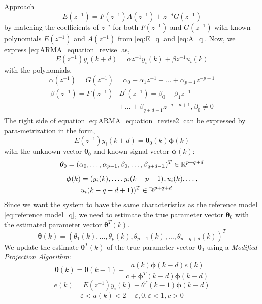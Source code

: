 \begin{section}{Approach}
    \begin{equation}
    \label{eq:Start}
	E(z^{-1})=F(z^{-1})A(z^{-1})+z^{-d}G(z^{-1})
	\end{equation}
by matching the coefficients of $z^{-i}$ for both $F(z^{-1})$ and $G(z^{-1})$ with known polynomials $E(z^{-1})$ and $A(z^{-1})$ from \eqref{eq:E_q} and \eqref{eq:A_q}.
Now, we express \eqref{eq:ARMA_equation_revise} as,
	\begin{equation}
	\label{eq:ARMA_equation_revise2}
	E(z^{-1})y_i(k+d)={\alpha}z^{-1}y_i(k) + {\beta}z^{-1}u_i(k)
	\end{equation}
with the polynomials,
	\begin{equation}
	\alpha(z^{-1})=G(z^{-1})=\alpha_0+\alpha_1z^{-1}+ \dots +\alpha_{p-1}z^{-p+1}
	\end{equation}
	\begin{align}
	\begin{split}
	\beta( z^{-1})= F(z^{-1})&B^{'}(z^{-1})=\beta_0+\beta_1z^{-1} \\
	& + \dots +\beta_{q+d-1}z^{-q-d+1}, \beta_0\neq0
	\end{split}
	\end{align}
The right side of equation \eqref{eq:ARMA_equation_revise2} can be expressed by para-metrization in the form,
    \begin{equation}
	E(z^{-1})y_i(k+d)=\bm{\theta}_0(k)\bm{\phi}(k)
	\end{equation}
with the unknown vector $\bm{\theta}_0$ and known signal vector $\bm{\phi}(k)$:
    \begin{equation}
	\bm{\theta}_0=(\alpha_0, \dots ,\alpha_{p-1},\beta_0, \dots ,\beta_{q+d-1})^T \in \mathbb{R}^{p+q+d}
	\end{equation}
	\begin{align}
	\begin{split}
	\bm{\phi}(k)&=(y_i(k), \dots ,y_i(k-p+1),u_i(k), \dots , \\
	& u_i(k-q-d+1))^T \in \mathbb{R}^{p+q+d}
	\end{split}
	\end{align}
Since we want the system to have the same characteristics as the reference model \eqref{eq:reference model_q}, we need to estimate the true parameter vector $\bm{\theta}_0$ with the estimated parameter vector $\bm{\theta}^T(k)$. 
    \begin{equation}
    \bm{\theta}(k)=(\theta_1(k), \dots ,\theta_p(k),\theta_{p+1}(k), \dots ,\theta_{p+q+d}(k))^T
	\end{equation}
We update the estimate $\bm{\theta}^T(k)$ of the true parameter vector $\bm{\theta}_0$ using a \textit{Modified Projection Algorithm}:
	\begin{equation}
	\label{eq:Modified_Proj_Algorithm}
	\bm{\theta}(k)=\bm{\theta}(k-1)+\frac{a(k)\bm{\phi}(k-d)e(k)}{c+\bm{\phi}^T(k-d)\bm{\phi}(k-d)}
	\end{equation}
	\begin{equation}
	e(k)=E(z^{-1})y_i(k)-\theta^T(k-1)\bm{\phi}(k-d)
	\end{equation}
	\begin{align*}
	\varepsilon<a(k)<2-\varepsilon, 0,\varepsilon<1, c>0
	\end{align*}
	

\end{section}
